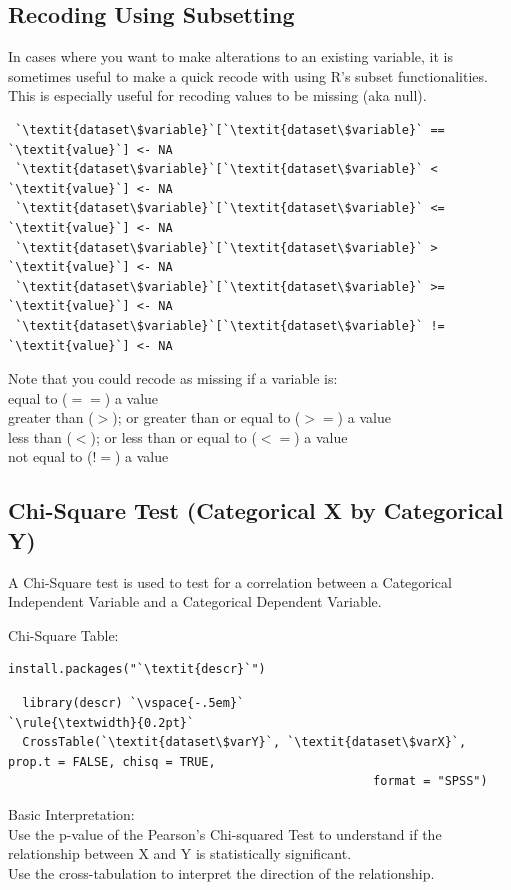\documentclass[12pt,letterpaper]{article}
\newcommand{\ind}{\phantom{AA}}
\begin{document}
\subsection{Recoding Using Subsetting}
In cases where you want to make alterations to an existing variable, it is sometimes useful to make a quick recode with using R's subset functionalities. This is especially useful for recoding values to be missing (aka null).
\begin{tcolorbox}[title = Recoding Using Subset Brackets]
\begin{lstlisting}
 `\textit{dataset\$variable}`[`\textit{dataset\$variable}` == `\textit{value}`] <- NA
 `\textit{dataset\$variable}`[`\textit{dataset\$variable}` <  `\textit{value}`] <- NA
 `\textit{dataset\$variable}`[`\textit{dataset\$variable}` <= `\textit{value}`] <- NA
 `\textit{dataset\$variable}`[`\textit{dataset\$variable}` >  `\textit{value}`] <- NA
 `\textit{dataset\$variable}`[`\textit{dataset\$variable}` >= `\textit{value}`] <- NA
 `\textit{dataset\$variable}`[`\textit{dataset\$variable}` != `\textit{value}`] <- NA
\end{lstlisting}
Note that you could recode as missing if a variable is:\\
\ind equal to ($==$) a value\\
\ind greater than ($>$); or greater than or equal to ($>=$) a value\\
\ind less than ($<$); or less than or equal to ($<=$) a value\\
\ind not equal to ($!=$) a value
\end{tcolorbox}

\subsection{Chi-Square Test (Categorical X by Categorical Y)}
A Chi-Square test is used to test for a correlation between a Categorical Independent Variable and a Categorical Dependent Variable.
\begin{tcolorbox}[title = Chi-Square Test (Categorical X by Categorical Y)]
Chi-Square Table:
\begin{lstlisting}[frameround = t t t t, backgroundcolor = \color{lightgray}]
  install.packages("`\textit{descr}`")
\end{lstlisting}
\begin{lstlisting}
  library(descr) `\vspace{-.5em}`
`\rule{\textwidth}{0.2pt}`
  CrossTable(`\textit{dataset\$varY}`, `\textit{dataset\$varX}`, prop.t = FALSE, chisq = TRUE,
                                                   format = "SPSS")
\end{lstlisting}
Basic Interpretation:\\
\ind Use the p-value of the Pearson's Chi-squared Test to understand if the \\ \ind \ind  relationship between X and Y is statistically significant.\\
\ind Use the cross-tabulation to interpret the direction of the relationship. 
\end{tcolorbox}
\end{document}
